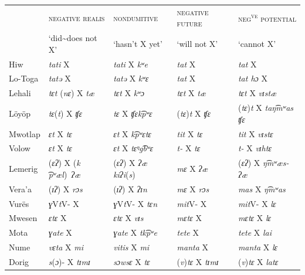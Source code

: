 \documentclass[output=paper,colorlinks,citecolor=brown,draft]{langscibook}
\begin{document}
\begin{table}
\footnotesize
\begin{tabularx}{\textwidth}{lXXXX}
\lsptoprule
 & {\scshape negative realis} & {\scshape nondumitive} & {\scshape negative future} & {\scshape neg\textsuperscript{ve} potential}\\
 &  ‘did{\textasciitilde}does not X’ & ‘hasn’t X yet’ & ‘will not X’ & ‘cannot X’\\
\midrule
{Hiw} &  \textit{tati} X &  \textit{tati} X \textit{kʷe} &  \textit{tat} X &  \textit{tat} X\\
{Lo-Toga} &  \textit{tatə} X &  \textit{tatə} X \textit{kʷɛ} &  \textit{tat} X &  \textit{tat hɔ} X\\
{Lehali} &  \textit{tɛt} (\textit{nɛ}) X \textit{tæ} &  \textit{tɛt} X \textit{kʷɔ} &  \textit{tɛt} X \textit{tæ} &  \textit{tɛt} X \textit{vɪstæ}\\
{Löyöp} &  \textit{tɛ}(\textit{t}) X \textit{ʧɛ} &  \textit{tɛ} X \textit{ʧɛk​͡pʷɛ} &  (\textit{tɛ})\textit{t} X \textit{ʧɛ} &  (\textit{tɛ})\textit{t} X \textit{taŋ​͡mʷas ʧɛ}\\
{Mwotlap} &  \textit{ɛt} X \textit{tɛ} &  \textit{ɛt} X \textit{k​͡pʷɛtɛ} &  \textit{tit} X \textit{tɛ} &  \textit{tit} X \textit{vɪstɛ}\\
{Volow} &  \textit{ɛt} X \textit{tɛ} &  \textit{ɛt} X \textit{tɛᵑg​͡bʷɛ} &  \textit{t-} X \textit{tɛ} &  \textit{t-} X \textit{vɪhtɛ}\\
{Lemerig} &  (\textit{ɛʔ}) X (\textit{k​͡pʷæl})~\textit{ʔæ} &  (\textit{ɛʔ}) X \textit{ʔæ kiʔi}(\textit{s}) &  \textit{mɛ} X \textit{ʔæ} &  (\textit{ɛʔ}) X \textit{ŋ​͡mʷæs-ʔæ}\\
{Vera'a} &  (\textit{ɪʔ}) X \textit{rɔs} &  (\textit{ɪʔ}) X \textit{ʔɪn} &  \textit{mɛ} X \textit{rɔs} &  \textit{mas} X \textit{ŋ​͡mʷas}\\
{Vurës} &  \textit{ɣ}V\textit{t}V- X &  \textit{ɣ}V\textit{t}V- X \textit{tɛn} &  \textit{mit}V- X &  \textit{mit}V- X \textit{lɛ}\\
{Mwesen} &  \textit{ɛtɛ} X &  \textit{ɛtɛ} X \textit{vɪs} &  \textit{mɛtɛ} X &  \textit{mɛtɛ} X \textit{lɛ}\\
{Mota} &  \textit{ɣate} X &  \textit{ɣate} X \textit{tk​͡pʷe} &  \textit{tete} X &  \textit{tete} X \textit{lai}\\
{Nume} &  \textit{vɛta} X \textit{mi} &  \textit{vitis} X \textit{mi} &  \textit{manta} X &  \textit{manta} X \textit{lɛ}\\
{Dorig} &  \textit{s}(\textit{ɔ})- X \textit{tɪmɪ} &  \textit{sɔwsɛ} X \textit{tɛ} &  (\textit{v})\textit{tɛ} X \textit{tɪmɪ} &  (\textit{v})\textit{tɛ} X \textit{latɛ}\\

\end{tabularx}
\end{table}
\end{document}
